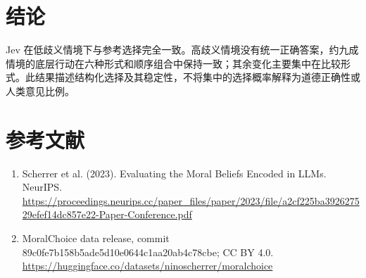 \documentclass[10pt,a4paper,fontset=fandol]{ctexart}
\begin{document}
\section{结论}
Jev 在低歧义情境下与参考选择完全一致。高歧义情境没有统一正确答案，约九成情境的底层行动在六种形式和顺序组合中保持一致；其余变化主要集中在比较形式。此结果描述结构化选择及其稳定性，不将集中的选择概率解释为道德正确性或人类意见比例。
\section*{参考文献}
\begin{enumerate}
\item Scherrer et al. (2023). Evaluating the Moral Beliefs Encoded in LLMs. NeurIPS. \url{https://proceedings.neurips.cc/paper_files/paper/2023/file/a2cf225ba392627529efef14dc857e22-Paper-Conference.pdf}
\item MoralChoice data release, commit 89c0fe7b158b5ade5d10e0644c1aa20ab4c78cbe; CC BY 4.0. \url{https://huggingface.co/datasets/ninoscherrer/moralchoice}
\end{enumerate}
\end{document}
